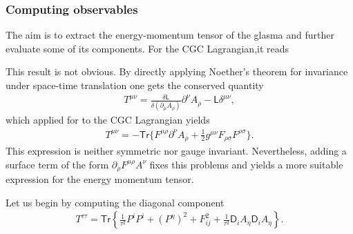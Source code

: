 

\subsubsection*{Computing observables}
The aim is to extract the energy-momentum tensor of the glasma and further evaluate some of its components. For the {\sffamily CGC} Lagrangian,it reads
\begin{note}
This result is not obvious. By directly applying Noether's theorem for invariance under space-time translation one gets the conserved quantity
\begin{align*}
    T^{\mu \nu}=\frac{\delta \textsf{L}}{\delta\left(\partial_{\mu} A_{\rho}\right)} \partial^{\nu} A_{\rho}-\textsf{L} \delta^{\mu \nu},
\end{align*}
which applied for to the {\sffamily CGC} Lagrangian
yields
\begin{align*}
    T^{\mu \nu}=-\textsf{Tr}\Big\{F^{\mu \rho} \partial^{\nu} A_{\rho}+\frac{1}{2} g^{\mu \nu} F_{\rho\sigma} F^{\rho\sigma}\Big\}.
\end{align*}
This expression is neither symmetric nor gauge invariant. Nevertheless, adding a surface term of the form $\partial_\rho F^{\mu\rho}A^\nu$ fixes this problems and yields a more suitable expression for the energy momentum tensor.
\end{note}
Let us begin by computing the diagonal component
\begin{align}\label{latt10}
    T^{\tau\tau}=\textsf{Tr}\left\{\frac{1}{\tau^2}P^iP^i+(P^\eta)^2+F_{ij}^2+\frac{1}{\tau^2}\textsf{D}_iA_\eta\textsf{D}_iA_\eta\right\}.
\end{align}

